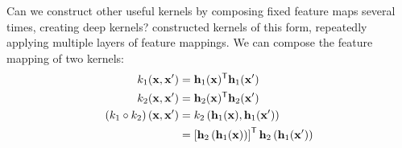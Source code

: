 
Can we construct other useful kernels by composing fixed feature maps several times, creating deep kernels?  \citet{cho2012kernel} constructed kernels of this form, repeatedly applying multiple layers of feature mappings.
We can compose the feature mapping of two kernels:
\begin{align}
k_{1}({\bf{x}}, {\bf{x}}') & = {\bf{h}}_1({\bf{x}}) ^{\mathsf{T}} {\bf{h}}_1({\bf{x}}') \\
k_{2}({\bf{x}}, {\bf{x}}') & = {\bf{h}}_2({\bf{x}}) ^{\mathsf{T}} {\bf{h}}_2({\bf{x}}') \\
\left( k_1 \circ k_2 \right)({\bf{x}}, {\bf{x}}') & = k_2 \left({\bf{h}}_1({\bf{x}}), {\bf{h}}_1({\bf{x}}') \right) \\
& = \left[ {\bf{h}}_2 \left( {\bf{h}}_1({\bf{x}}) \right)\right] ^{\mathsf{T}} {\bf{h}}_2 \left({\bf{h}}_1({\bf{x}}') \right) 
\end{align}

